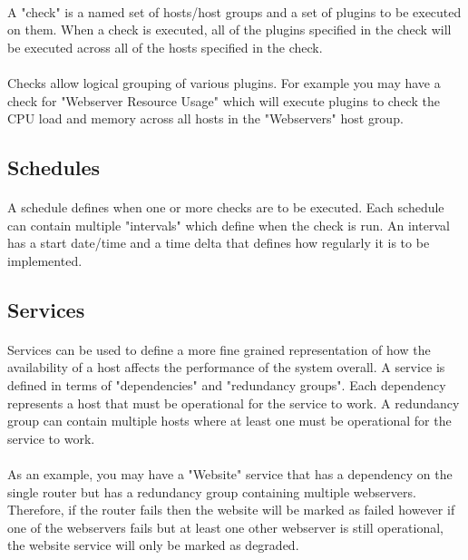 \documentclass[bsc,logo,twoside]{infthesis}
\begin{document}
\paragraph*{}
	A "check" is a named set of hosts/host groups and a set of plugins to be
	executed on them.  When a check is executed, all of the plugins specified in
	the check will be executed across all of the hosts specified in the check.
	
\paragraph*{}
	Checks allow logical grouping of various plugins.  For example you may have a
	check for "Webserver Resource Usage" which will execute plugins to check the
	CPU load and memory across all hosts in the "Webservers" host group.

\subsection{Schedules}
\paragraph*{}
	A schedule defines when one or more checks are to be executed.  Each schedule
	can contain multiple "intervals" which define when the check is run.  An
	interval has a start date/time and a time delta that defines how regularly
	it is to be implemented.

\subsection{Services}
\paragraph*{}
	Services can be used to define a more fine grained representation of how the
	availability of a host affects the performance of the system overall.  A
	service is defined in terms of "dependencies" and "redundancy groups". Each
	dependency represents a host that must be operational for the service to
	work. A redundancy group can contain multiple hosts where at least one must
	be operational for the service to work.
	
\paragraph*{}
	As an example, you may have a "Website" service that has a dependency on
	the single router but has a redundancy group containing multiple webservers.
	Therefore, if the router fails then the website will be marked as failed
	however if one of the webservers fails but at least one other webserver is
	still operational, the website service will only be marked as degraded.
\end{document}
